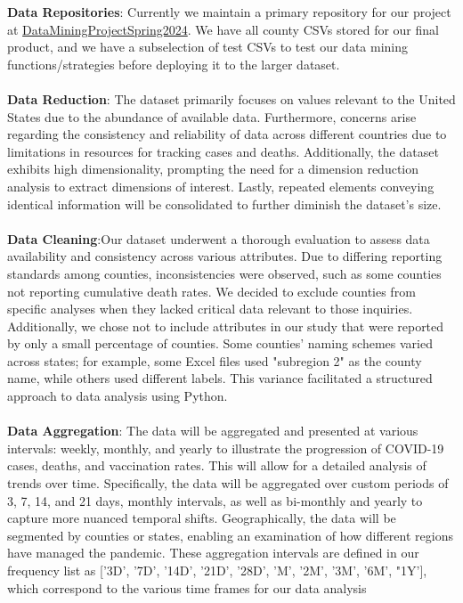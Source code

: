 \documentclass[sigconf,screen,nonacm]{acmart}
\begin{document}
\textbf{Data Repositories}: Currently we maintain a primary repository for our project at \href{https://github.com/CCoakley6/DataMiningProjectSpring2024}{DataMiningProjectSpring2024}. We have all county CSVs stored for our final product, and we have a subselection of test CSVs to test our data mining functions/strategies before deploying it to the larger dataset.\\
\\
\textbf{Data Reduction}: The dataset primarily focuses on values relevant to the United States due to the abundance of available data. Furthermore, concerns arise regarding the consistency and reliability of data across different countries due to limitations in resources for tracking cases and deaths. Additionally, the dataset exhibits high dimensionality, prompting the need for a dimension reduction analysis to extract dimensions of interest. Lastly, repeated elements conveying identical information will be consolidated to further diminish the dataset's size.\\
\\
\textbf{Data Cleaning}:Our dataset underwent a thorough evaluation to assess data availability and consistency across various attributes. Due to differing reporting standards among counties, inconsistencies were observed, such as some counties not reporting cumulative death rates. We decided to exclude counties from specific analyses when they lacked critical data relevant to those inquiries. Additionally, we chose not to include attributes in our study that were reported by only a small percentage of counties. Some counties' naming schemes varied across states; for example, some Excel files used "subregion 2" as the county name, while others used different labels. This variance facilitated a structured approach to data analysis using Python. \\
\\
\textbf{Data Aggregation}: The data will be aggregated and presented at various intervals: weekly, monthly, and yearly to illustrate the progression of COVID-19 cases, deaths, and vaccination rates. This will allow for a detailed analysis of trends over time. Specifically, the data will be aggregated over custom periods of 3, 7, 14, and 21 days, monthly intervals, as well as bi-monthly and yearly to capture more nuanced temporal shifts. Geographically, the data will be segmented by counties or states, enabling an examination of how different regions have managed the pandemic. These aggregation intervals are defined in our frequency list as ['3D', '7D', '14D', '21D', '28D', 'M', '2M', '3M', '6M', "1Y'], which correspond to the various time frames for our data analysis\\ 
\end{document}
